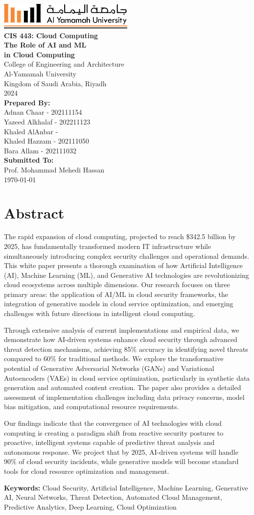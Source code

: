 \documentclass[a4paper,12pt]{article}
\def\maketitle{
  \begin{titlepage}
    \centering
    \vspace*{-1cm}
    \includegraphics[width=0.5\textwidth]{yu-logo.png}\\[2cm]
    {\huge\bfseries CIS 443: Cloud Computing \\[0.5cm] The Role of AI and ML\\[0.25cm]in Cloud Computing}\\[2cm]
    {\Large College of Engineering and Architecture}\\
    {Al-Yamamah University}\\
    {Kingdom of Saudi Arabia, Riyadh}\\[1cm]
    2024\\[2cm]
    {\large\bfseries Prepared By:}\\[0.3cm]
    Adnan Chaar - 202111154\\
    Yazeed Alkhalaf - 202211123\\
    Khaled AlAnbar - \\
    Khaled Hazzam - 202111050\\
    Bara Allam - 202111032\\
    [2cm]
    {\large\bfseries Submitted To:}\\[0.3cm]
    Prof. Mohammad Mehedi Hassan\\[2cm]
    {\large \today}
    \vfill
  \end{titlepage}
}
\begin{document}
\maketitle

\thispagestyle{fancy}
\tableofcontents
\newpage
\thispagestyle{fancy}
\listoffigures
\newpage

\setcounter{page}{1}

\section*{Abstract}
The rapid expansion of cloud computing, projected to reach \$342.5 billion by 2025, has fundamentally transformed modern IT infrastructure while simultaneously introducing complex security challenges and operational demands. This white paper presents a thorough examination of how Artificial Intelligence (AI), Machine Learning (ML), and Generative AI technologies are revolutionizing cloud ecosystems across multiple dimensions. Our research focuses on three primary areas: the application of AI/ML in cloud security frameworks, the integration of generative models in cloud service optimization, and emerging challenges with future directions in intelligent cloud computing.

Through extensive analysis of current implementations and empirical data, we demonstrate how AI-driven systems enhance cloud security through advanced threat detection mechanisms, achieving 85\% accuracy in identifying novel threats compared to 60\% for traditional methods. We explore the transformative potential of Generative Adversarial Networks (GANs) and Variational Autoencoders (VAEs) in cloud service optimization, particularly in synthetic data generation and automated content creation. The paper also provides a detailed assessment of implementation challenges including data privacy concerns, model bias mitigation, and computational resource requirements.

Our findings indicate that the convergence of AI technologies with cloud computing is creating a paradigm shift from reactive security postures to proactive, intelligent systems capable of predictive threat analysis and autonomous response. We project that by 2025, AI-driven systems will handle 90\% of cloud security incidents, while generative models will become standard tools for cloud resource optimization and management.

\textbf{Keywords:} Cloud Security, Artificial Intelligence, Machine Learning, Generative AI, Neural Networks, Threat Detection, Automated Cloud Management, Predictive Analytics, Deep Learning, Cloud Optimization
\end{document}
